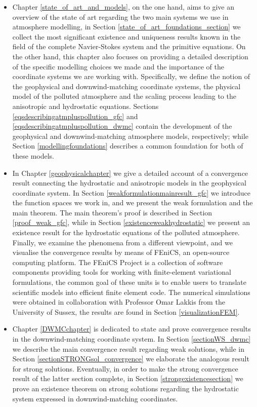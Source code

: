 \documentclass[12pt]{report}
\numberwithin{theorem}{chapter}
\numberwithin{corollary}{chapter}
\numberwithin{lemma}{chapter}
\numberwithin{remark}{chapter}
\numberwithin{definition}{chapter}
\numberwithin{prop}{chapter}
\begin{document}
\begin{itemize}

  \item Chapter \ref{state_of_art_and_models}, on the one hand, aims to give an overview of the state of art regarding the two main systems we use in atmosphere modelling, in Section \ref{state_of_art_foundations_section} we collect the most significant existence and uniqueness results known in the field of the complete Navier-Stokes system and the primitive equations. On the other hand, this chapter also focuses on providing a detailed description of the specific modelling choices we made and the importance of the coordinate systems we are working with. Specifically, we define the notion of the geophysical and downwind-matching coordinate systems, the physical model of the polluted atmosphere and the scaling process leading to the anisotropic and hydrostatic equations. Sections \ref{eqsdescribingatmpluspollution_gfc} and \ref{eqsdescribingatmpluspollution_dwmc} contain the development of the geophysical and downwind-matching atmosphere models, respectively; while Section \ref{modellingfoundations} describes a common foundation for both of these models.

  \item In Chapter \ref{geophysicalchapter} we give a detailed account of a convergence result connecting the hydrostatic and anisotropic models in the geophysical coordinate system. In Section \ref{weakformulationmainresult_gfc} we introduce the function spaces we work in, and we present the weak formulation and the main theorem. The main theorem's proof is described in Section \ref{proof_weak_gfc}, while in Section \ref{existenceweakhydrostatic} we present an existence result for the hydrostatic equations of the polluted atmosphere. Finally, we examine the phenomena from a different viewpoint, and we visualise the convergence results by means of FEniCS, an open-source computing platform. The FEniCS Project is a collection of software components providing tools for working with finite-element variational formulations, the common goal of these units is to enable users to translate scientific models into efficient finite element code. The numerical simulations were obtained in collaboration with Professor Omar Lakkis from the University of Sussex, the results are found in Section \ref{visualizationFEM}.
  
  \item Chapter \ref{DWMCchapter} is dedicated to state and prove convergence results in the downwind-matching coordinate system. In Section \ref{sectionWS_dwmc} we describe the main convergence result regarding weak solutions, while in Section \ref{sectionSTRONGsol_convergence} we elaborate the analogous result for strong solutions. Eventually, in order to make the strong convergence result of the latter section complete, in Section \ref{strongexistencesection} we prove an existence theorem on strong solutions regarding the hydrostatic system expressed in downwind-matching coordinates.

\end{itemize}
\end{document}
